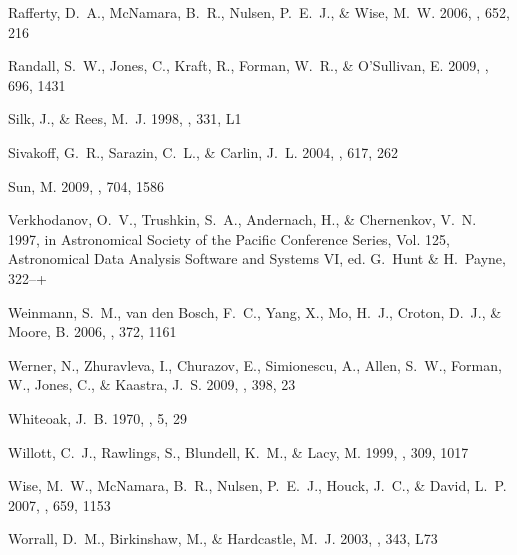 \documentclass[12pt, preprint]{aastex}
\begin{document}
\begin{thebibliography}{68}
{Rafferty}, D.~A., {McNamara}, B.~R., {Nulsen}, P.~E.~J., \& {Wise}, M.~W.
  2006, \apj, 652, 216

{Randall}, S.~W., {Jones}, C., {Kraft}, R., {Forman}, W.~R., \& {O'Sullivan},
  E. 2009, \apj, 696, 1431

{Silk}, J., \& {Rees}, M.~J. 1998, \aap, 331, L1

{Sivakoff}, G.~R., {Sarazin}, C.~L., \& {Carlin}, J.~L. 2004, \apj, 617, 262

{Sun}, M. 2009, \apj, 704, 1586

{Verkhodanov}, O.~V., {Trushkin}, S.~A., {Andernach}, H., \& {Chernenkov},
  V.~N. 1997, in Astronomical Society of the Pacific Conference Series, Vol.
  125, Astronomical Data Analysis Software and Systems VI, ed. G.~{Hunt} \&
  H.~{Payne}, 322--+

{Weinmann}, S.~M., {van den Bosch}, F.~C., {Yang}, X., {Mo}, H.~J., {Croton},
  D.~J., \& {Moore}, B. 2006, \mnras, 372, 1161

{Werner}, N., {Zhuravleva}, I., {Churazov}, E., {Simionescu}, A., {Allen},
  S.~W., {Forman}, W., {Jones}, C., \& {Kaastra}, J.~S. 2009, \mnras, 398, 23

{Whiteoak}, J.~B. 1970, \aplett, 5, 29

{Willott}, C.~J., {Rawlings}, S., {Blundell}, K.~M., \& {Lacy}, M. 1999,
  \mnras, 309, 1017

{Wise}, M.~W., {McNamara}, B.~R., {Nulsen}, P.~E.~J., {Houck}, J.~C., \&
  {David}, L.~P. 2007, \apj, 659, 1153

{Worrall}, D.~M., {Birkinshaw}, M., \& {Hardcastle}, M.~J. 2003, \mnras, 343,
  L73


\end{thebibliography}
\end{document}

